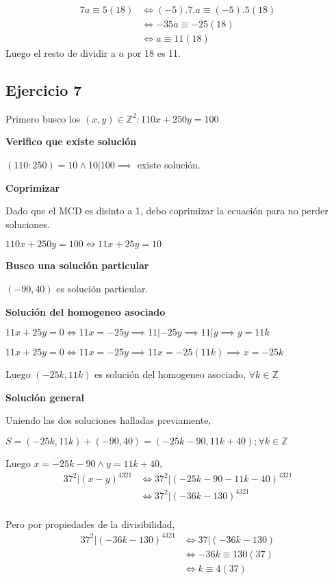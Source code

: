 \begin{align*}
    7a \equiv 5(18) &\iff (-5).7.a \equiv (-5).5(18) \\  
    &\iff -35a \equiv -25(18) \\
    &\iff a \equiv 11(18)
\end{align*}
Luego el resto de dividir a $a$ por 18 es 11.

\subsection{Ejercicio 7}
Primero busco los $ (x,y) \in \mathbb{Z}^2: 110x+250y=100 $

\textbf{Verifico que existe solución}

$ (110:250) = 10 \wedge 10|100 \implies $ existe solución.

\textbf{Coprimizar}

Dado que el MCD es disinto a 1, debo coprimizar la ecuación para no perder soluciones.

$ 110x+250y =100 \leftrightsquigarrow 11x+25y=10$

\textbf{Busco una solución particular}

$ (-90,40) $ es solución particular.

\textbf{Solución del homogeneo asociado}

$ 11x+25y = 0 \iff 11x = -25y \implies 11|-25y \implies 11|y \implies y=11k $

$ 11x+25y = 0 \iff 11x = -25y \implies 11x=-25(11k) \implies x = -25k $

Luego $ (-25k, 11k) $ es solución del homogeneo asociado, $ \forall k \in \mathbb{Z} $

\textbf{Solución general}

Uniendo las dos soluciones halladas previamente,

$ S = (-25k, 11k) + (-90,40) = (-25k-90, 11k+40); \forall k \in \mathbb{Z} $

Luego $ x = -25k-90 \wedge y= 11k+40 $,
\begin{align*}
    37^2 |(x-y)^{4321} &\iff 37^2 | (-25k-90-11k-40)^{4321} \\
    &\iff 37^2 | (-36k-130)^{4321} \\
\end{align*}

Pero por propiedades de la divisibilidad,
\begin{align*}
    37^2 | (-36k-130)^{4321} &\iff 37|(-36k-130) \\
    &\iff -36k \equiv 130(37) \\
    &\iff k \equiv 4(37) \\
\end{align*}


